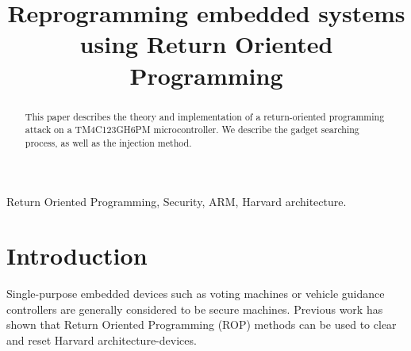 
\usepackage{listings}


\title{Reprogramming embedded systems using Return Oriented Programming}

\author{
}

\maketitle


\begin{abstract}
This paper describes the theory and implementation of a return-oriented programming attack on a TM4C123GH6PM microcontroller. We describe the gadget searching process, as well as the injection method. 


\end{abstract}

\begin{IEEEkeywords}
Return Oriented Programming, Security, ARM, Harvard architecture.
\end{IEEEkeywords}

\section{Introduction}
	Single-purpose embedded devices such as voting machines or vehicle guidance controllers are generally considered to be secure machines. Previous work has shown that Return Oriented Programming (ROP) methods can be used to clear and reset Harvard architecture-devices. %

